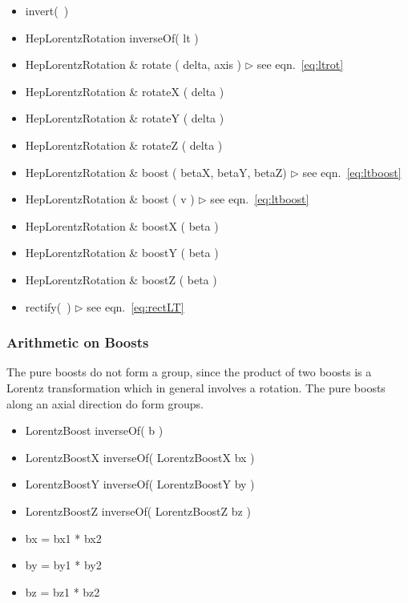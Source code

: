 \documentclass[twoside,12pt]{article}
\newcommand {\see}[1] {\hfill$\triangleright$ see eqn.~#1}
\newenvironment{shortlist}{%
\begin{itemize}
\setlength{\itemsep}{0pt}
\setlength{\parskip}{0pt}
}{%
\end{itemize}
}
\begin{document}
\begin{shortlist}
  \item invert(~)
  \item HepLorentzRotation inverseOf( lt )
\end{shortlist}

\begin{shortlist}
  \item HepLorentzRotation \& rotate ( delta, axis ) 	\see{\ref{eq:ltrot}}
  \item HepLorentzRotation \& rotateX ( delta ) 
  \item HepLorentzRotation \& rotateY ( delta ) 
  \item HepLorentzRotation \& rotateZ ( delta ) 
  \item HepLorentzRotation \& boost ( betaX, betaY, betaZ) \see{\ref{eq:ltboost}}
  \item HepLorentzRotation \& boost ( v )		\see{\ref{eq:ltboost}}
  \item HepLorentzRotation \& boostX ( beta ) 
  \item HepLorentzRotation \& boostY ( beta ) 
  \item HepLorentzRotation \& boostZ ( beta ) 
\end{shortlist}

\begin{shortlist}
  \item rectify(~)					\see{\ref{eq:rectLT}}
\end{shortlist}

\subsubsection{Arithmetic on Boosts}

The pure boosts do not form a group, since the product of two 
boosts is a Lorentz transformation which in general involves a rotation.
The pure boosts along an axial direction do form groups.

\begin{shortlist}
  \item LorentzBoost inverseOf( b )
  \item LorentzBoostX inverseOf( LorentzBoostX bx )
  \item LorentzBoostY inverseOf( LorentzBoostY by )
  \item LorentzBoostZ inverseOf( LorentzBoostZ bz )
\end{shortlist}

\begin{shortlist}
  \item bx = bx1 * bx2
  \item by = by1 * by2
  \item bz = bz1 * bz2
\end{shortlist}
\end{document}
